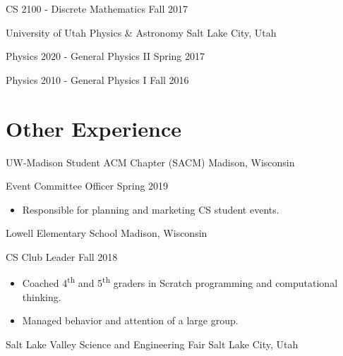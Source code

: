 \begin{tab2} CS 2100 - Discrete Mathematics \> Fall 2017 \end{tab2}

\blockskip

\begin{tab1} University of Utah Physics \& Astronomy \> Salt Lake City, Utah \end{tab1}

\begin{tab2} Physics 2020 - General Physics II \> Spring 2017 \end{tab2}

\begin{tab2} Physics 2010 - General Physics I \> Fall 2016 \end{tab2}

\section*{Other Experience}

\begin{tab1} UW-Madison Student ACM Chapter (SACM) \> Madison, Wisconsin \end{tab1}

\begin{tab2} Event Committee Officer \> Spring 2019 \end{tab2}
\begin{itemize}
    \item Responsible for planning and marketing CS student events.
\end{itemize}

\blockskip

\begin{tab1} Lowell Elementary School \> Madison, Wisconsin \end{tab1}

\begin{tab2} CS Club Leader \> Fall 2018 \end{tab2}
\begin{itemize}
    \item Coached 4\textsuperscript{th} and 5\textsuperscript{th} graders in Scratch programming and computational thinking.
    \item Managed behavior and attention of a large group.
\end{itemize}

\blockskip

\begin{tab1} Salt Lake Valley Science and Engineering Fair \> Salt Lake City, Utah \end{tab1}

